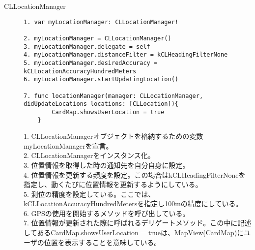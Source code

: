 \begin{description}
\item[CLLocationManager]\mbox{} 
\begin{lstlisting}[basicstyle=\ttfamily\footnotesize, frame=single]
1. var myLocationManager: CLLocationManager!

2. myLocationManager = CLLocationManager()
3. myLocationManager.delegate = self
4. myLocationManager.distanceFilter = kCLHeadingFilterNone
5. myLocationManager.desiredAccuracy = kCLLocationAccuracyHundredMeters
6. myLocationManager.startUpdatingLocation()

7. func locationManager(manager: CLLocationManager,
didUpdateLocations locations: [CLLocation]){
        CardMap.showsUserLocation = true
    }
 \end{lstlisting}

1. CLLocationManagerオブジェクトを格納するための変数myLocationManagerを宣言。\\
2. CLLocationManagerをインスタンス化。\\
3. 位置情報を取得した時の通知先を自分自身に設定。\\
4. 位置情報を更新する頻度を設定。この場合はkCLHeadingFilterNoneを指定し、動くたびに位置情報を更新するようにしている。 \\
5. 測位の精度を設定している。ここでは、kCLLocationAccuracyHundredMetersを指定し100mの精度にしている。 \\
6. GPSの使用を開始するメソッドを呼び出している。\\
7. 位置情報が更新された際に呼ばれるデリゲートメソッド。この中に記述してあるCardMap.showsUserLocation = trueは、MapView(CardMap)にユーザの位置を表示することを意味している。\\
\end{description}

